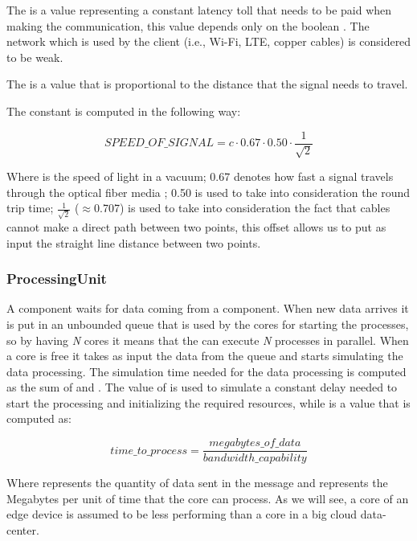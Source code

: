 The  is a value representing a constant latency toll that needs to be paid when making the communication, this value depends only on the boolean . The network which is used by the client (i.e., Wi-Fi, LTE, copper cables) is considered to be weak.

The  is a value that is proportional to the distance that the signal needs to travel.

The constant  is computed in the following way:

\[ SPEED\_OF\_SIGNAL = c \cdot 0.67 \cdot 0.50 \cdot \frac{1}{\sqrt{2}} \]

Where  is the speed of light in a vacuum; 0.67 denotes how fast a signal travels through the optical fiber media \cite{optical-fiber-latency}; 0.50 is used to take into consideration the round trip time; \(\frac{1}{\sqrt{2}}\) ($\approx$0.707) is used to take into consideration the fact that cables cannot make a direct path between two points, this offset allows us to put as input the straight line distance between two points.


\subsubsection{ProcessingUnit}
A  component waits for data coming from a  component. When new data arrives it is put in an unbounded queue that is used by the cores for starting the processes, so by having \textit{N} cores it means that the  can execute \textit{N} processes in parallel.
When a core is free it takes as input the data from the queue and starts simulating the data processing. The simulation time needed for the data processing is computed as the sum of  and . The value of  is used to simulate a constant delay needed to start the processing and initializing the required resources, while  is a value that is computed as:

\[ time\_to\_process = \frac{megabytes\_of\_data}{bandwidth\_capability} \]

Where  represents the quantity of data sent in the message and  represents the Megabytes per unit of time that the core can process. As we will see, a core of an edge device is assumed to be less performing than a core in a big cloud data-center.


